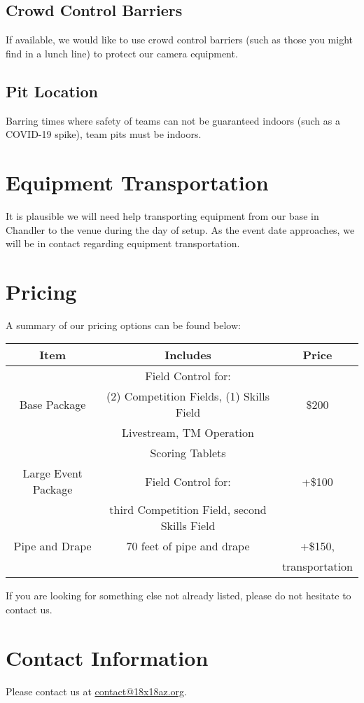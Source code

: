 \documentclass[12pt]{article}
\begin{document}
\subsection{Crowd Control Barriers}
If available, we would like to use crowd control barriers (such as those you might find in a lunch line) to protect our camera equipment.

\subsection{Pit Location}
Barring times where safety of teams can not be guaranteed indoors (such as a COVID-19 spike), team pits must be indoors.

\section{Equipment Transportation}
It is plausible we will need help transporting equipment from our base in Chandler to the venue during the day of setup.
As the event date approaches, we will be in contact regarding equipment transportation.

\section{Pricing}
A summary of our pricing options can be found below:
\begin{center}
    \begin{tabular}{|c|c|c|}
        \hline
        \textbf{Item} & \textbf{Includes} & \textbf{Price} \\
        \hline
                 & Field Control for:    &  \\
        Base Package & (2) Competition Fields, (1) Skills Field         & \$200 \\
                 & Livestream, TM Operation & \\
                 & Scoring Tablets          & \\
        \hline
        Large Event Package & Field Control for: & +\$100 \\
        & third Competition Field, second Skills Field & \\
        \hline
        Pipe and Drape & 70 feet of pipe and drape & +\$150, \\
                       & & transportation \\
        \hline
    \end{tabular}
\end{center}
If you are looking for something else not already listed, please do not hesitate to contact us.

\section{Contact Information}
Please contact us at \href{mailto:contact@18x18az.org}{contact@18x18az.org}.
\end{document}
